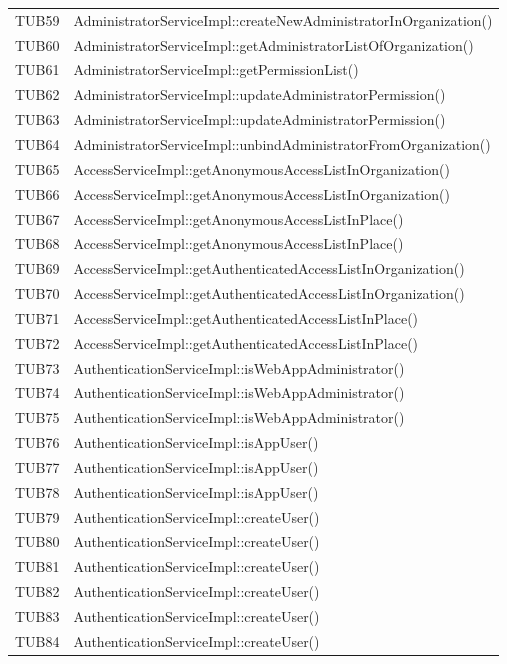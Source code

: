 {\begin{longtable}{C{2cm} C{12cm}}
		TUB59 & AdministratorServiceImpl::createNewAdministratorInOrganization()\\
		TUB60 & AdministratorServiceImpl::getAdministratorListOfOrganization()\\
		TUB61 & AdministratorServiceImpl::getPermissionList()\\
		TUB62 & AdministratorServiceImpl::updateAdministratorPermission()\\
		TUB63 & AdministratorServiceImpl::updateAdministratorPermission()\\
		TUB64 & AdministratorServiceImpl::unbindAdministratorFromOrganization()\\
		TUB65 & AccessServiceImpl::getAnonymousAccessListInOrganization()\\
		TUB66 & AccessServiceImpl::getAnonymousAccessListInOrganization()\\
		TUB67 & AccessServiceImpl::getAnonymousAccessListInPlace()\\
		TUB68 & AccessServiceImpl::getAnonymousAccessListInPlace()\\
		TUB69 & AccessServiceImpl::getAuthenticatedAccessListInOrganization()\\
		TUB70 & AccessServiceImpl::getAuthenticatedAccessListInOrganization()\\
		TUB71 & AccessServiceImpl::getAuthenticatedAccessListInPlace()\\
		TUB72 & AccessServiceImpl::getAuthenticatedAccessListInPlace()\\
		TUB73 & AuthenticationServiceImpl::isWebAppAdministrator()\\
		TUB74 & AuthenticationServiceImpl::isWebAppAdministrator()\\
		TUB75 & AuthenticationServiceImpl::isWebAppAdministrator()\\
		TUB76 & AuthenticationServiceImpl::isAppUser()\\
		TUB77 & AuthenticationServiceImpl::isAppUser()\\
		TUB78 & AuthenticationServiceImpl::isAppUser()\\
		TUB79 & AuthenticationServiceImpl::createUser()\\
		TUB80 & AuthenticationServiceImpl::createUser()\\
		TUB81 & AuthenticationServiceImpl::createUser()\\
		TUB82 & AuthenticationServiceImpl::createUser()\\
		TUB83 & AuthenticationServiceImpl::createUser()\\
		TUB84 & AuthenticationServiceImpl::createUser()\\

\end{longtable}}
